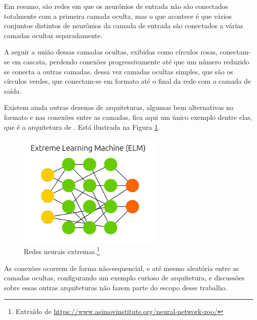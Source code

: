 Em resumo, são redes em que os neurônios de entrada não são conectados totalmente com a primeira camada oculta, mas o que acontece é que vários conjuntos distintos de neurônios da camada de entrada são conectados a várias camadas ocultas separadamente.

A seguir a união dessas camadas ocultas, exibidas como círculos rosas, conectam-se em cascata, perdendo conexões progressivamente até que um número reduzido se conecta a outras camadas, dessa vez camadas ocultas simples, que são os círculos verdes, que conectam-se em formato  até o final da rede com a camada de saída. 

Existem ainda outras dezenas de arquiteturas, algumas bem alternativas no formato e nas conexões entre as camadas, fica aqui um único exemplo dentre elas, que é a arquitetura de . Está ilustrada na Figura \ref{fig:estrutura_e}.

\begin{figure}[htb]
\centering
\includegraphics[width=7cm]{figuras/estrutura_e}
\caption{Redes neurais extremas.\footnote{Extraído de \url{https://www.asimovinstitute.org/neural-network-zoo/}}}
\label{fig:estrutura_e}
\end{figure}

As conexões ocorrem de forma não-sequencial, e até mesmo aleatória entre as camadas ocultas, configurando um exemplo curioso de arquitetura, e discussões sobre essas outras arquiteturas não fazem parte do escopo desse trabalho.